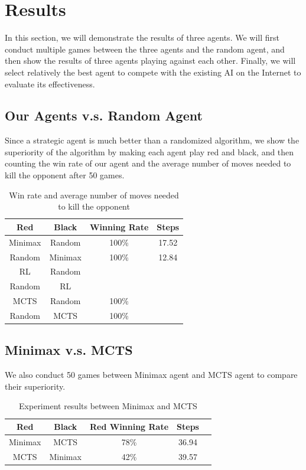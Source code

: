 \documentclass[letterpaper]{article}
\begin{document}
    \section{Results}\label{sec:results}
    In this section, we will demonstrate the results of three agents.
    We will first conduct multiple games between the three agents and the random agent, and then show the results of three agents playing against each other.
    Finally, we will select relatively the best agent to compete with the existing AI on the Internet to evaluate its effectiveness.

    \subsection{Our Agents v.s. Random Agent}
    \label{subsec:our-agents-vs-random-agent}
    Since a strategic agent is much better than a randomized algorithm, we show the superiority of the algorithm by making each agent play red and black, and then counting the win rate of our agent and the average number of moves needed to kill the opponent after 50 games.
    \begin{table}[htbp]
        \centering
        \caption{Win rate and average number of moves needed to kill the opponent}
        \label{tab:tab1}
        \begin{tabular}{|c|c|c|c|}
            \hline
            Red     & Black   & Winning Rate & Steps \\ \hline
            Minimax & Random  & 100\%        & 17.52 \\ \hline
            Random  & Minimax & 100\%        & 12.84 \\ \hline
            RL      & Random  &              &       \\ \hline
            Random  & RL      &              &       \\ \hline
            MCTS    & Random  & 100\%        &       \\ \hline
            Random  & MCTS    & 100\%        &       \\ \hline
        \end{tabular}
    \end{table}

    \subsection{Minimax v.s. MCTS}
    \label{subsec:minimax-v.s.-mcts}
    We also conduct 50 games between Minimax agent and MCTS agent to compare their superiority.
    \begin{table}[htbp]
        \centering
        \caption{Experiment results between Minimax and MCTS}
        \label{tab:tab2}
        \begin{tabular}{|c|c|c|c|c|}
            \hline
            Red     & Black   & Red Winning Rate & Steps \\ \hline
            Minimax & MCTS    & 78\%             & 36.94 \\ \hline
            MCTS    & Minimax & 42\%             & 39.57 \\ \hline
        \end{tabular}
    \end{table}
\end{document}
